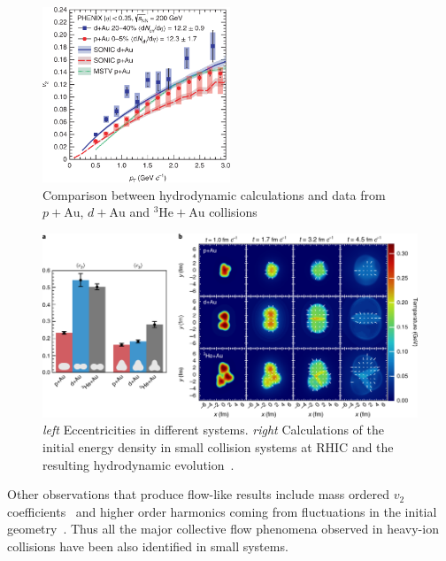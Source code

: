 \begin{figure}[htb]
\centering

		\includegraphics[width=0.5\textwidth]{figures/41567_2018_360_Fig4_HTML.png}
                \caption{Comparison between hydrodynamic calculations and data from $p+\mathrm{Au}$, $d+\mathrm{Au}$ and $^3\mathrm{He+Au}$ collisions~\cite{PHENIX:2018lia}}
	\label{fig:smallsystems1}
\end{figure}

\begin{figure}[b!]
\centering
            	\includegraphics[width=\textwidth]{figures/PhenixNature_1.png}
	\caption{{\it left} Eccentricities in different systems. {\it right} Calculations of the initial energy density in small collision systems at RHIC and the resulting hydrodynamic evolution~\cite{PHENIX:2018lia}.}
	\label{fig:smallhydro}
	\end{figure}


Other observations that produce flow-like results include mass ordered $v_2$ coefficients~\cite{CMS:2018rfr} and higher order harmonics coming from fluctuations in the initial geometry~\cite{Acharya:2017ino}. Thus all the major collective flow phenomena observed in heavy-ion collisions have been also identified in small systems.

